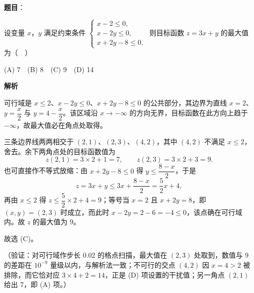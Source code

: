 \begin{answer}

\textbf{题目}：

设变量 \(x\)，\(y\) 满足约束条件 \(\begin{cases}x-2\leqslant0,\\x-2y\leqslant0,\\x+2y-8\leqslant0,\end{cases}\) 则目标函数 \(z=3x+y\) 的最大值为（　）

(A) 7　(B) 8　(C) 9　(D) 14

\textbf{解析}

可行域是 \(x\leqslant 2\)、\(x-2y\leqslant 0\)、\(x+2y-8\leqslant 0\) 的公共部分，其边界为直线 \(x=2\)、\(y=\dfrac{x}{2}\) 与 \(y=4-\dfrac{x}{2}\)。该区域沿 \(x\to-\infty\) 的方向无界，目标函数在此方向上趋于 \(-\infty\)，故最大值必在角点处取得。

三条边界线两两相交于 \((2,1)\)、\((2,3)\)、\((4,2)\)，其中 \((4,2)\) 不满足 \(x\leqslant 2\)，舍去。余下两角点处的目标函数值为
\nopagebreak[4]
\[
z(2,1)=3\times 2+1=7,\qquad z(2,3)=3\times 2+3=9.
\]
也可直接作不等式放缩：由 \(x+2y-8\leqslant 0\) 得 \(y\leqslant \dfrac{8-x}{2}\)，于是
\nopagebreak[4]
\[
z=3x+y\leqslant 3x+\dfrac{8-x}{2}=\dfrac{5}{2}x+4,
\]
再由 \(x\leqslant 2\) 得 \(z\leqslant \dfrac{5}{2}\times 2+4=9\)；等号当 \(x=2\) 且 \(x+2y=8\)，即 \((x,y)=(2,3)\) 时成立，而此时 \(x-2y=2-6=-4\leqslant 0\)，该点确在可行域内。故 \(z\) 的最大值为 \(9\)。

故选 (C)。

（验证：对可行域作步长 \(0.02\) 的格点扫描，最大值在 \((2,3)\) 处取到，数值与 \(9\) 的差距在 \(10^{-9}\) 量级以内，与解析法一致；不可行的交点 \((4,2)\) 因 \(x=4>2\) 被排除，而它恰对应 \(3\times 4+2=14\)，正是 (D) 项设置的干扰值；另一角点 \((2,1)\) 给出 \(7\)，即 (A) 项。）


\end{answer}
